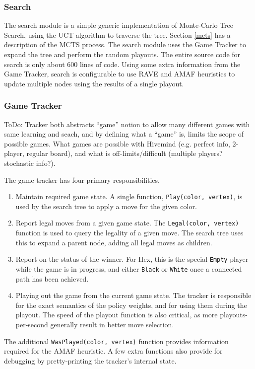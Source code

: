 \documentclass[11pt]{report}
\newcommand{\black}{\texttt{Black}}
\newcommand{\white}{\texttt{White}}
\begin{document}
\subsubsection{Search}
The search module is a simple generic implementation of Monte-Carlo Tree Search, using the UCT algorithm to traverse the tree. Section \ref{mcts} has a description of the MCTS process. The search module uses the Game Tracker to expand the tree and perform the random playouts. The entire source code for search is only about 600 lines of code. Using some extra information from the Game Tracker, search is configurable to use RAVE and AMAF heuristics to update multiple nodes using the results of a single playout.

\subsubsection{Game Tracker}
ToDo: Tracker both abstracts ``game'' notion to allow many different games with same learning and seach, and by defining what a ``game'' is, limits the scope of possible games. What games are possible with Hivemind (e.g. perfect info, 2-player, regular board), and what is off-limits/difficult (multiple players? stochastic info?).

The game tracker has four primary responsibilities.
\begin{enumerate}
\item{Maintain required game state. A single function, \texttt{Play(color, vertex)}, is used by the search tree to apply a move for the given color.}
\item{Report legal moves from a given game state. The \texttt{Legal(color, vertex)} function is used to query the legality of a given move. The search tree uses this to expand a parent node, adding all legal moves as children.}
\item{Report on the status of the winner. For Hex, this is the special \texttt{Empty} player while the game is in progress, and either \black{} or \white{} once a connected path has been achieved.}
\item{Playing out the game from the current game state. The tracker is responsible for the exact semantics of the policy weights, and for using them during the playout. The speed of the playout function is also critical, as more playouts-per-second generally result in better move selection.}
\end{enumerate}
The additional \texttt{WasPlayed(color, vertex)} function provides information required for the AMAF heuristic. A few extra functions also provide for debugging by pretty-printing the tracker's internal state.
\end{document}

